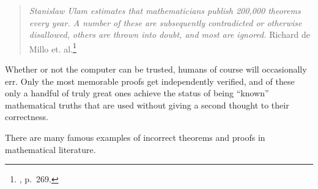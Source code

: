 \begin{quote}
  {\em Stanislaw Ulam estimates that mathematicians publish 200,000 theorems
  every year.  A number of these are subsequently contradicted or otherwise
  disallowed, others are thrown into doubt, and most are ignored.}
  \flushright\sc Richard de Millo et. al.\footnote{\cite{deMillo}, p.~269.}\\
\end{quote}

Whether or not the computer can be trusted, humans  of course will occasionally
err. Only the most memorable proofs get independently verified, and of these
only a handful of truly great ones achieve the status of being ``known''
mathematical truths that are used without giving a second thought to their
correctness.

There are many famous examples of incorrect theorems and proofs in
mathematical literature.

